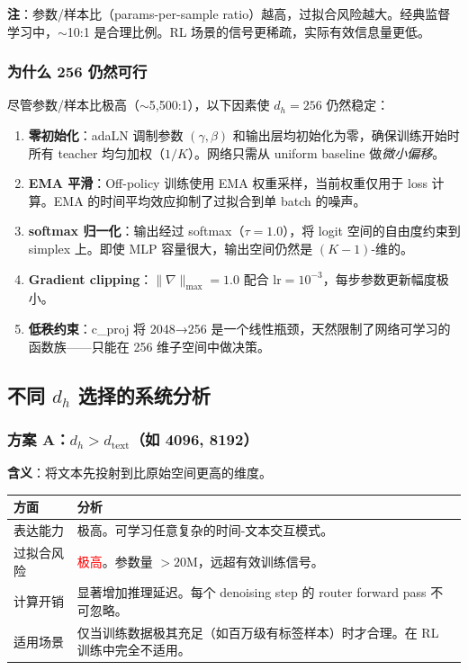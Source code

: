 \documentclass[11pt,a4paper]{article}
\begin{document}
\textbf{注}：参数/样本比（params-per-sample ratio）越高，过拟合风险越大。经典监督学习中，$\sim$10:1 是合理比例。RL 场景的信号更稀疏，实际有效信息量更低。

\subsubsection{为什么 256 仍然可行}

尽管参数/样本比极高（$\sim$5,500:1），以下因素使 $d_h = 256$ 仍然稳定：

\begin{enumerate}
    \item \textbf{零初始化}：adaLN 调制参数 $(\gamma, \beta)$ 和输出层均初始化为零，确保训练开始时所有 teacher 均匀加权（$1/K$）。网络只需从 uniform baseline 做\emph{微小偏移}。
    \item \textbf{EMA 平滑}：Off-policy 训练使用 EMA 权重采样，当前权重仅用于 loss 计算。EMA 的时间平均效应抑制了过拟合到单 batch 的噪声。
    \item \textbf{softmax 归一化}：输出经过 softmax（$\tau = 1.0$），将 logit 空间的自由度约束到 simplex 上。即使 MLP 容量很大，输出空间仍然是 $(K{-}1)$-维的。
    \item \textbf{Gradient clipping}：$\|\nabla\|_{\max} = 1.0$ 配合 $\text{lr} = 10^{-3}$，每步参数更新幅度极小。
    \item \textbf{低秩约束}：c\_proj 将 2048→256 是一个线性瓶颈，天然限制了网络可学习的函数族——只能在 256 维子空间中做决策。
\end{enumerate}

\subsection{不同 $d_h$ 选择的系统分析}

\subsubsection{方案 A：$d_h > d_{\text{text}}$（如 4096, 8192）}

\textbf{含义}：将文本先投射到比原始空间更高的维度。

\begin{center}
\begin{tabular}{>{\raggedright}p{3cm}|p{9cm}}
\toprule
\textbf{方面} & \textbf{分析} \\
\midrule
表达能力 & 极高。可学习任意复杂的时间-文本交互模式。\\
过拟合风险 & \textcolor{red}{极高}。参数量 $> 20$M，远超有效训练信号。\\
计算开销 & 显著增加推理延迟。每个 denoising step 的 router forward pass 不可忽略。\\
适用场景 & 仅当训练数据极其充足（如百万级有标签样本）时才合理。在 RL 训练中完全不适用。\\
\bottomrule
\end{tabular}
\end{center}
\end{document}
